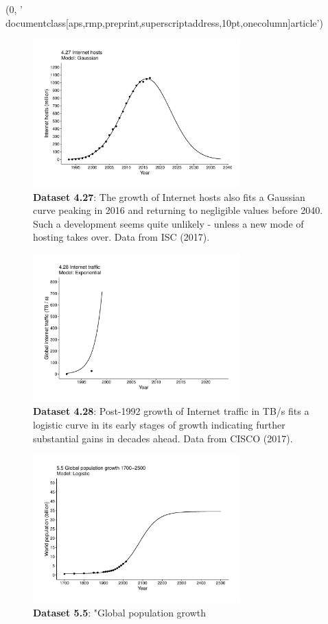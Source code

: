 (0, '\\documentclass[aps,rmp,preprint,superscriptaddress,10pt,onecolumn]{article}\n')
\begin{document}
\begin{figure}[h]
\includegraphics[width=8cm]{output/figs-ggplot/4.27.pdf}
\caption{\textbf{Dataset 4.27}: The growth of Internet hosts also fits a Gaussian curve peaking in 2016 and returning to negligible values before 2040. Such a development seems quite unlikely - unless a new mode of hosting takes over. Data from ISC (2017).}
\end{figure}
	
\begin{figure}[h]
\includegraphics[width=8cm]{output/figs-ggplot/4.28.pdf}
\caption{\textbf{Dataset 4.28}: Post-1992 growth of Internet traffic in TB/s fits a logistic curve in its early stages of growth indicating further substantial gains in decades ahead. Data from CISCO (2017).}
\end{figure}
	
\begin{figure}[h]
\includegraphics[width=8cm]{output/figs-ggplot/5.5.pdf}
\caption{\textbf{Dataset 5.5}: "Global population growth}
\end{figure}
	
\end{document}
